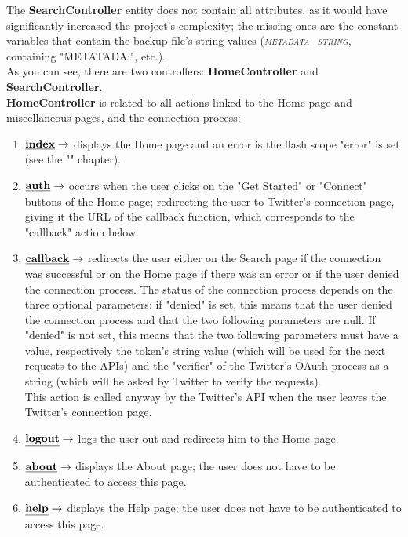 \documentclass[a4paper,11pt]{report}
\begin{document}
The \textbf{SearchController} entity does not contain all attributes, as it would have significantly increased the project's complexity; the missing ones are the constant variables that contain the backup file's string values (\textit{\textsc{metadata\_string}}, containing "METATADA:", etc.).\\
As you can see, there are two controllers: \textbf{HomeController} and \textbf{SearchController}.\\

\textbf{HomeController} is related to all actions linked to the Home page and miscellaneous pages, and the connection process:
\begin{enumerate}
\item $\textbf{\underline{index}}\to$ displays the Home page and an error is the flash scope "error" is set (see the "" chapter).
\item $\textbf{\underline{auth}}\to$ occurs when the user clicks on the "Get Started" or "Connect" buttons of the Home page; redirecting the user to Twitter's connection page, giving it the URL of the callback function, which corresponds to the "callback" action below.
\item $\textbf{\underline{callback}}\to$ redirects the user either on the Search page if the connection was successful or on the Home page if there was an error or if the user denied the connection process. The status of the connection process depends on the three optional parameters: if "denied" is set, this means that the user denied the connection process and that the two following parameters are null. If "denied" is not set, this means that the two following parameters must have a value, respectively the token's string value (which will be used for the next requests to the APIs) and the "verifier" of the Twitter's OAuth process as a string (which will be asked by Twitter to verify the requests).\\
This action is called anyway by the Twitter's API when the user leaves the Twitter's connection page.
\item $\textbf{\underline{logout}}\to$ logs the user out and redirects him to the Home page.
\item $\textbf{\underline{about}}\to$ displays the About page; the user does not have to be authenticated to access this page.
\item $\textbf{\underline{help}}\to$ displays the Help page; the user does not have to be authenticated to access this page.
\end{enumerate}
\end{document}
